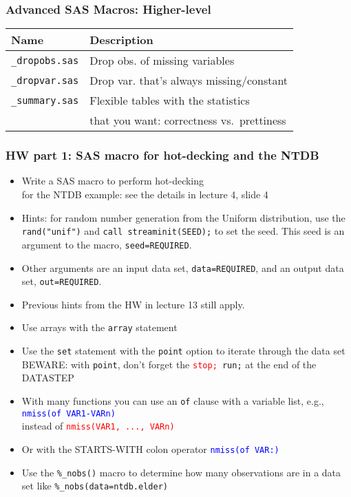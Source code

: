 \documentclass[11pt,pdftex,dvipsnames,usenames,helvetica]{beamer}
\begin{document}
\begin{frame}[fragile]
\frametitle{Advanced SAS Macros: Higher-level}
\begin{center}
\begin{tabular}{ll}
Name               & Description \\ \hline
{\tt \_dropobs.sas}& Drop obs. of missing variables\\
{\tt \_dropvar.sas}& Drop var. that's always missing/constant\\
{\tt \_summary.sas}& Flexible tables with the statistics\\
& that you want: correctness vs.\ prettiness \\
\end{tabular}
\end{center}
\end{frame}

\begin{frame}[fragile]
\frametitle{HW part 1: SAS macro for hot-decking and the NTDB}
\begin{itemize}
\item Write a SAS macro to perform hot-decking\\
 for the NTDB example: see the details in lecture 4, slide 4
\item Hints: for random number generation from the Uniform
  distribution, use the {\tt rand("unif")} and {\tt call
    streaminit(SEED);} to set the seed.  This seed is 
an argument to the macro, {\tt seed=REQUIRED}.
\item Other arguments are an input data set, {\tt data=REQUIRED},
and an output data set, {\tt out=REQUIRED}.
\item Previous hints from the HW in lecture 13 still apply.
 \item Use arrays with the {\tt array} statement
 \item Use the {\tt set} statement with the {\tt point} option to
   iterate through the data set BEWARE: with {\tt point}, don't forget
   the {\tt \textcolor{red}{stop;} run;} at the end of the DATASTEP
\item With many functions you can use an {\tt of} clause with a variable
list, e.g., \textcolor{blue}{\tt nmiss(of VAR1-VARn)}\\
instead of \textcolor{red}{\tt nmiss(VAR1, ..., VARn)}
\item Or with the STARTS-WITH colon operator
 \textcolor{blue}{\tt nmiss(of VAR:)}
\item Use the {\tt \%\_nobs()} macro to determine how many
observations are in a data set like {\tt \%\_nobs(data=ntdb.elder)}
\end{itemize}
\end{frame}
\end{document}
